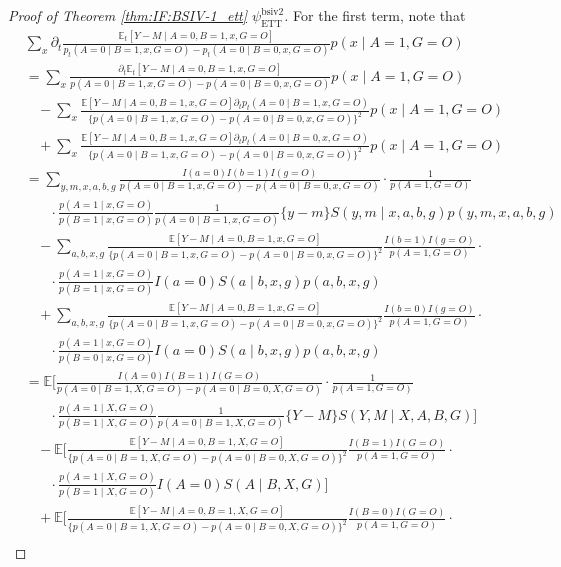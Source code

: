 \documentclass[10pt]{article}
\begin{document}
\begin{proof}[Proof of Theorem \ref{thm:IF:BSIV-1_ett} $\psi_{\text{ETT}}^{\text{bsiv2}}$]
For the first term, note that
{\footnotesize \begin{align*}
    &\sum_{x}\partial_t\frac{\mathbb{E}_t[Y-M\mid A=0,B=1,x,G=O]}{p_t(A=0\mid B=1,x,G=O)-p_t(A=0\mid B=0,x,G=O)}p(x\mid A=1,G=O)\\
    &=\sum_{x}\frac{\partial_t\mathbb{E}_t[Y-M\mid A=0,B=1,x,G=O]}{p(A=0\mid B=1,x,G=O)-p(A=0\mid B=0,x,G=O)}p(x\mid A=1,G=O)\\
    &\ \ \ \ -\sum_{x}\frac{\mathbb{E}[Y-M\mid A=0,B=1,x,G=O]\partial_tp_t(A=0\mid B=1,x,G=O)}{\{p(A=0\mid B=1,x,G=O)-p(A=0\mid B=0,x,G=O)\}^2}p(x\mid A=1,G=O)\\
    &\ \ \ \ +\sum_{x}\frac{\mathbb{E}[Y-M\mid A=0,B=1,x,G=O]\partial_tp_t(A=0\mid B=0,x,G=O)}{\{p(A=0\mid B=1,x,G=O)-p(A=0\mid B=0,x,G=O)\}^2}p(x\mid A=1,G=O)\\
    &=\sum_{y,m,x,a,b,g}\frac{I(a=0)I(b=1)I(g=O)}{p(A=0\mid B=1,x,G=O)-p(A=0\mid B=0,x,G=O)}\cdot\frac{1}{p(A=1,G=O)}\\
    &\ \ \ \ \ \ \ \ \cdot\frac{p(A=1\mid x,G=O)}{p(B=1\mid x,G=O)}\frac{1}{p(A=0\mid B=1,x,G=O)}\{y-m\}S(y,m\mid x,a,b,g)p(y,m,x,a,b,g)\\
    &\ \ \ \ -\sum_{a,b,x,g}\frac{\mathbb{E}[Y-M\mid A=0,B=1,x,G=O]}{\{p(A=0\mid B=1,x,G=O)-p(A=0\mid B=0,x,G=O)\}^2}\frac{I(b=1)I(g=O)}{p(A=1,G=O)}\cdot\\
    &\ \ \ \ \ \ \ \ \cdot\frac{p(A=1\mid x,G=O)}{p(B=1\mid x, G=O)}I(a=0)S(a\mid b,x,g)p(a,b,x,g)\\
    &\ \ \ \ +\sum_{a,b,x,g}\frac{\mathbb{E}[Y-M\mid A=0,B=1,x,G=O]}{\{p(A=0\mid B=1,x,G=O)-p(A=0\mid B=0,x,G=O)\}^2}\frac{I(b=0)I(g=O)}{p(A=1,G=O)}\cdot\\
    &\ \ \ \ \ \ \ \ \cdot\frac{p(A=1\mid x,G=O)}{p(B=0\mid x, G=O)}I(a=0)S(a\mid b,x,g)p(a,b,x,g)\\
    &=\mathbb{E}\bigg[\frac{I(A=0)I(B=1)I(G=O)}{p(A=0\mid B=1,X,G=O)-p(A=0\mid B=0,X,G=O)}\cdot\frac{1}{p(A=1,G=O)}\\
    &\ \ \ \ \ \ \ \ \cdot\frac{p(A=1\mid X,G=O)}{p(B=1\mid X,G=O)}\frac{1}{p(A=0\mid B=1,X,G=O)}\{Y-M\}S(Y,M\mid X,A,B,G)\bigg]\\
    &\ \ \ \ -\mathbb{E}\bigg[\frac{\mathbb{E}[Y-M\mid A=0,B=1,X,G=O]}{\{p(A=0\mid B=1,X,G=O)-p(A=0\mid B=0,X,G=O)\}^2}\frac{I(B=1)I(G=O)}{p(A=1,G=O)}\cdot\\
    &\ \ \ \ \ \ \ \ \cdot\frac{p(A=1\mid X,G=O)}{p(B=1\mid X, G=O)}I(A=0)S(A\mid B,X,G)\bigg]\\
    &\ \ \ \ +\mathbb{E}\bigg[\frac{\mathbb{E}[Y-M\mid A=0,B=1,X,G=O]}{\{p(A=0\mid B=1,X,G=O)-p(A=0\mid B=0,X,G=O)\}^2}\frac{I(B=0)I(G=O)}{p(A=1,G=O)}\cdot\\

\end{align*}}
\end{proof}
\end{document}
